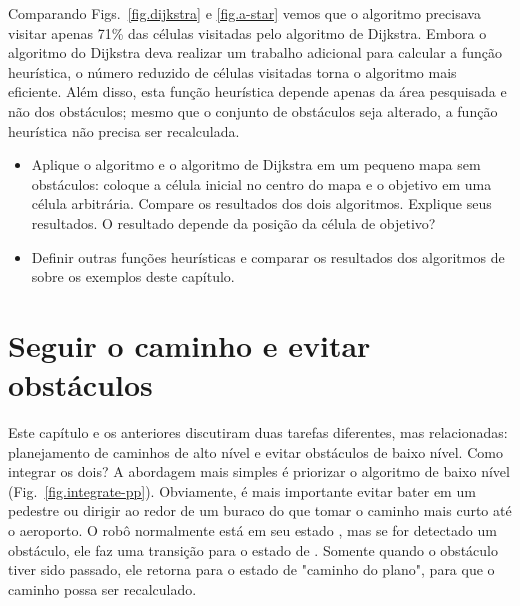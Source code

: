 Comparando Figs.~\ref{fig.dijkstra} e \ref{fig.a-star} vemos que o algoritmo \astar{} precisava visitar apenas 71\% das células visitadas pelo algoritmo de Dijkstra. Embora o algoritmo \astar{} do Dijkstra deva realizar um trabalho adicional para calcular a função heurística, o número reduzido de células visitadas torna o algoritmo mais eficiente. Além disso, esta função heurística depende apenas da área pesquisada e não dos obstáculos; mesmo que o conjunto de obstáculos seja alterado, a função heurística não precisa ser recalculada.

\begin{framed}
\begin{itemize}
\item Aplique o algoritmo \astar{} e o algoritmo de Dijkstra em um pequeno mapa sem obstáculos: coloque a célula inicial no centro do mapa e o objetivo em uma célula arbitrária. Compare os resultados dos dois algoritmos. Explique seus resultados. O resultado depende da posição da célula de objetivo?
\item Definir outras funções heurísticas e comparar os resultados dos algoritmos de \astar{} sobre os exemplos deste capítulo.
\end{itemize}
\end{framed}

\section{Seguir o caminho e evitar obstáculos}\label{s.path-and-obstacle}

Este capítulo e os anteriores discutiram duas tarefas diferentes, mas relacionadas: planejamento de caminhos de alto nível e evitar obstáculos de baixo nível. Como integrar os dois? A abordagem mais simples é priorizar o algoritmo de baixo nível (Fig.~\ref{fig.integrate-pp}). Obviamente, é mais importante evitar bater em um pedestre ou dirigir ao redor de um buraco do que tomar o caminho mais curto até o aeroporto. O robô normalmente está em seu estado , mas se for detectado um obstáculo, ele faz uma transição para o estado de . Somente quando o obstáculo tiver sido passado, ele retorna para o estado de "caminho do plano", para que o caminho possa ser recalculado.

